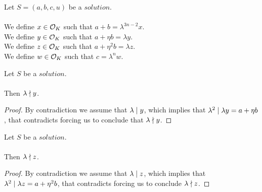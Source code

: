 \begin{definition}[$x,y,z,w$]
    \label{def:Solution_x_y_z_w}
    \leanok
    Let $S=(a, b, c, u)$ be a $solution$.\\\\
    We define $x \in \mathcal{O}_K$ such that $a + b = \lambda^{3n-2}  x$.\\
    We define $y \in \mathcal{O}_K$ such that $a + \eta  b = \lambda  y$.\\
    We define $z \in \mathcal{O}_K$ such that $a + \eta^2  b = \lambda  z$.\\
    We define $w \in \mathcal{O}_K$ such that $c = \lambda^n  w$.
\end{definition}

\begin{lemma}
    \label{lmm:lambda_not_dvd_y}
    \leanok
    Let $S$ be a $solution$.\\\\
    Then $\lambda \nmid y$.
\end{lemma}
\begin{proof}
    \leanok
    By contradiction we assume that $\lambda \mid y$, which implies that
    $\lambda^2 \mid \lambda y = a + \eta b$, that contradicts
     forcing us to conclude that
    $\lambda \nmid y$.
\end{proof}

\begin{lemma}
    \label{lmm:lambda_not_dvd_z}
    \leanok
    Let $S$ be a $solution$.\\\\
    Then $\lambda \nmid z$.
\end{lemma}
\begin{proof}
    \leanok
    By contradiction we assume that $\lambda \mid z$, which implies that
    $\lambda^2 \mid \lambda z = a + \eta^2 b$, that contradicts
     forcing us to conclude $\lambda \nmid z$.
\end{proof}

